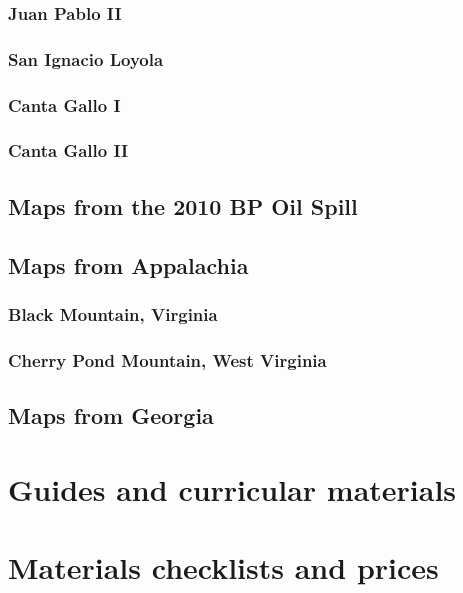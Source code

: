 \documentclass[11pt]{report}
\begin{document}
\subsection{Juan Pablo II}

\subsection{San Ignacio Loyola}

\subsection{Canta Gallo I}

\subsection{Canta Gallo II}

\section{Maps from the 2010 BP Oil Spill}



\section{Maps from Appalachia}

\subsection{Black Mountain, Virginia}

\subsection{Cherry Pond Mountain, West Virginia}

\section{Maps from Georgia}


\chapter{Guides and curricular materials}


\chapter{Materials checklists and prices}
\end{document}
